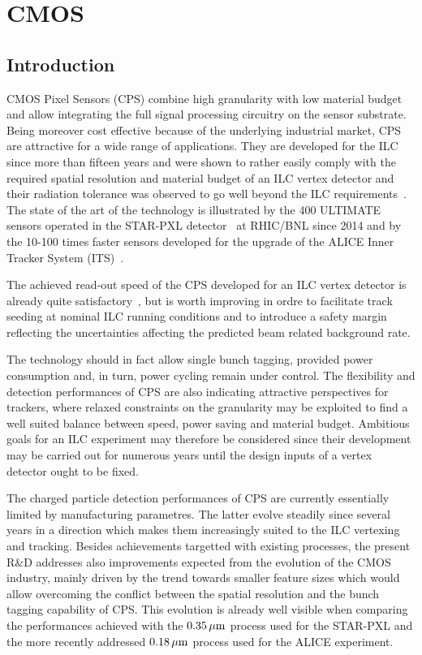 \section{CMOS}
\subsection{Introduction}
CMOS Pixel Sensors (CPS) combine high granularity with low material
budget and allow integrating the full signal processing circuitry on
the sensor substrate. Being moreover cost effective because of the
underlying industrial market, CPS are attractive for a wide range of
applications. They are developed for the ILC since more than fifteen
years and were shown to rather easily comply with the required spatial
resolution and material budget of an ILC vertex detector and their
radiation tolerance was observed to go well beyond the ILC requirements~\cite{Behnke:2013lya}. The state of the art of the technology is illustrated
by the 400 ULTIMATE sensors  operated in the STAR-PXL detector~\cite{Greiner201168}
at RHIC/BNL since 2014 and by the 10-100 times faster
sensors developed for the upgrade of the ALICE Inner Tracker System
(ITS)~\cite{0954-3899-41-8-087002}.


The achieved read-out speed of the CPS developed for an ILC
vertex detector is already quite satisfactory~\cite{Behnke:2013lya},
but is worth
improving in ordre to facilitate track seeding at nominal ILC
running conditions and to introduce a safety margin reflecting the
uncertainties affecting the predicted beam related background rate.

The technology should in fact allow single bunch tagging, provided power
consumption and, in turn, power cycling remain under control. The flexibility and detection performances of CPS are also indicating attractive perspectives for trackers, where relaxed constraints on the granularity may be exploited
to find a well suited balance between speed, power saving and material budget. Ambitious goals for an ILC experiment may therefore be considered
since their development may be carried out for numerous years until the design
inputs of a vertex detector ought to be fixed.

The charged particle detection performances of CPS are
currently essentially limited by manufacturing parametres.
The latter evolve steadily since several years in a direction which makes
them increasingly suited to the ILC vertexing and tracking. Besides
achievements targetted with existing processes, the present R\&D
addresses also improvements expected from the evolution of the CMOS
industry, mainly driven by the trend towards smaller feature sizes which
would allow overcoming the conflict between the spatial resolution and the
bunch tagging capability of CPS. This evolution is already well visible
when comparing the performances achieved with the $\unit[0.35]{\mu m}$ process
used for the STAR-PXL and the more recently addressed $\unit[0.18]{\mu m}$ process
used for the ALICE experiment.


